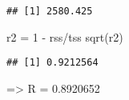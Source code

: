 \documentclass[
]{article}
\newenvironment{Shaded}{\begin{snugshade}}{\end{snugshade}}
\newcommand{\DecValTok}[1]{\textcolor[rgb]{0.00,0.00,0.81}{#1}}
\newcommand{\FunctionTok}[1]{\textcolor[rgb]{0.00,0.00,0.00}{#1}}
\newcommand{\NormalTok}[1]{#1}
\newcommand{\OtherTok}[1]{\textcolor[rgb]{0.56,0.35,0.01}{#1}}
\newcommand{\SpecialCharTok}[1]{\textcolor[rgb]{0.00,0.00,0.00}{#1}}
\begin{document}
\begin{verbatim}
## [1] 2580.425
\end{verbatim}

\begin{Shaded}
\begin{Highlighting}[]
\NormalTok{r2 }\OtherTok{=} \DecValTok{1} \SpecialCharTok{{-}}\NormalTok{ rss}\SpecialCharTok{/}\NormalTok{tss}
\FunctionTok{sqrt}\NormalTok{(r2)}
\end{Highlighting}
\end{Shaded}

\begin{verbatim}
## [1] 0.9212564
\end{verbatim}

=\textgreater{} R = 0.8920652
\end{document}
